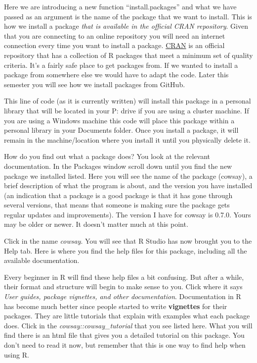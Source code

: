 \documentclass[
]{book}
\begin{document}
Here we are introducing a new function ``install.packages'' and what we have passed as an argument is the name of the package that we want to install. This is how we install a package \emph{that is available in the official CRAN repository}. Given that you are connecting to an online repository you will need an internet connection every time you want to install a package. \href{https://cran.r-project.org/}{CRAN} is an official repository that has a collection of R packages that meet a minimum set of quality criteria. It's a fairly safe place to get packages from. If we wanted to install a package from somewhere else we would have to adapt the code. Later this semester you will see how we install packages from GitHub.

This line of code (as it is currently written) will install this package in a personal library that will be located in your P: drive if you are using a cluster machine. If you are using a Windows machine this code will place this package within a personal library in your Documents folder. Once you install a package, it will remain in the machine/location where you install it until you physically delete it.

How do you find out what a package does? You look at the relevant documentation. In the Packages window scroll down until you find the new package we installed listed. Here you will see the name of the package (cowsay), a brief description of what the program is about, and the version you have installed (an indication that a package is a good package is that it has gone through several versions, that means that someone is making sure the package gets regular updates and improvements). The version I have for cowsay is 0.7.0. Yours may be older or newer. It doesn't matter much at this point.

Click in the name \emph{cowsay}. You will see that R Studio has now brought you to the Help tab. Here is where you find the help files for this package, including all the available documentation.

Every beginner in R will find these help files a bit confusing. But after a while, their format and structure will begin to make sense to you. Click where it says \emph{User guides, package vignettes, and other documentation}. Documentation in R has become much better since people started to write \textbf{vignettes} for their packages. They are little tutorials that explain with examples what each package does. Click in the \emph{cowsay::cowsay\_tutorial} that you see listed here. What you will find there is an html file that gives you a detailed tutorial on this package. You don't need to read it now, but remember that this is one way to find help when using R.
\end{document}
